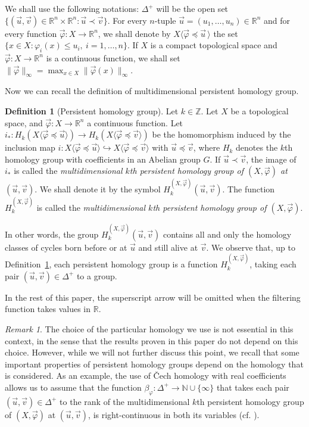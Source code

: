 \documentclass{amsart}
\theoremstyle{definition}
\newtheorem{definition}[theorem]{Definition}
\theoremstyle{remark}
\newtheorem{remark}[theorem]{Remark}
\newcommand{\p}{\varphi}
\newcommand{\R}{\mathbb{R}}
\newcommand{\fr}{\vec \varphi}
\numberwithin{equation}{section}
\begin{document}
We shall use the following notations: $\Delta^+$ will be the open
set $\{(\vec u,\vec v)\in\R^n\times\R^n:\vec u\prec\vec v\}$.
For every $n$-tuple $\vec
u=(u_1,\dots,u_n)\in\R^n$ and for every function
$\vec\p:X\to\R^n$, we shall denote by $X\langle\fr\preceq \vec
u\,\rangle$ the set $\{x\in X:\varphi_i(x)\leq u_i,\
i=1,\dots,n\}$. If $X$ is a compact topological space and $\vec\p:X\to\R^n$ is a continuous function, we shall set $\|\vec \varphi\|_\infty=\max_{x\in X}\|\vec \varphi(x)\|_\infty$.

Now we can recall the definition of multidimensional persistent homology group.


\begin{definition}[Persistent homology group]\label{PersHom}
Let $k\in\mathbb{Z}$. Let $X$ be a topological space, and $\fr:X\to\R^n$ a continuous
function. Let $i_*:{H}_k(X\langle\vec\p\preceq\vec
u\rangle)\rightarrow {H}_k(X\langle\vec\p\preceq\vec
v\rangle)$ be the homomorphism induced by the inclusion map
$i:X\langle\vec\p\preceq\vec
u\rangle\hookrightarrow X\langle\vec\p\preceq\vec v\rangle$ with
$\vec u\preceq\vec v$, where ${H}_k$ denotes the $k$th
homology group with coefficients in an Abelian group $G$. If $\vec u\prec\vec v$, the image of
$i_*$ is called the {\em multidimensional
$k$th persistent homology group of $(X,\vec\p)$ at $(\vec u, \vec
v)$}. We shall denote it by the symbol ${H}_k^{(X,\vec\p)}(\vec u, \vec v)$.
The function ${H}_k^{(X,\vec\p)}$ is called the {\em multidimensional
$k$th persistent homology group of $(X,\vec\p)$}.
\end{definition}

In other words, the group ${H}_k^{(X,\vec\p)}(\vec u, \vec v)$ contains all and only the homology classes of
cycles born before or at $\vec u$ and still alive at $\vec v$. We observe that, up to Definition~\ref{PersHom}, each persistent homology group is a function ${H}_k^{(X,\vec\p)}$, taking each pair $(\vec u,\vec v)\in \Delta^+$ to a group.

In the rest of this paper, the superscript arrow will be omitted when the filtering function takes values in $\R$.

\begin{remark}\label{rem_hom}
The choice of the particular homology we use is not essential in this context, in the sense that the results proven in this paper do not depend on this choice. However, while we will not further discuss this point, we recall that some important properties of persistent homology groups depend on the homology that is considered. As an example, the use of \v{C}ech homology with real coefficients allows us to assume that the function $\beta_\varphi:\Delta^+\to \mathbb{N}\cup \{\infty\}$ that takes each pair $(\vec u,\vec v)\in \Delta^+$ to the rank of the multidimensional $k$th persistent homology group of $(X,\vec\p)$ at $(\vec u, \vec v)$, is right-continuous in both its variables (cf. \cite{CeDiFeFrLa09}).
\end{remark}
\end{document}
